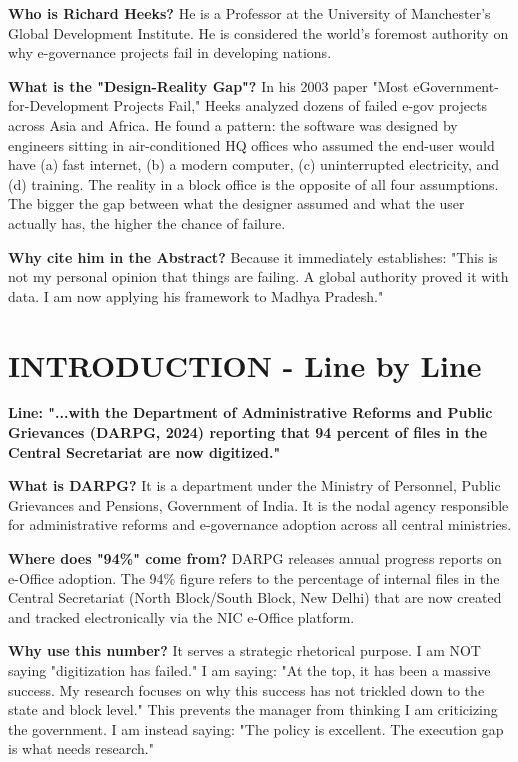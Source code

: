 \documentclass[11pt,a4paper]{article}
\begin{document}
\begin{abox}
\textbf{Who is Richard Heeks?} He is a Professor at the University of Manchester's Global Development Institute. He is considered the world's foremost authority on why e-governance projects fail in developing nations.

\textbf{What is the "Design-Reality Gap"?} In his 2003 paper "Most eGovernment-for-Development Projects Fail," Heeks analyzed dozens of failed e-gov projects across Asia and Africa. He found a pattern: the software was designed by engineers sitting in air-conditioned HQ offices who assumed the end-user would have (a) fast internet, (b) a modern computer, (c) uninterrupted electricity, and (d) training. The reality in a block office is the opposite of all four assumptions. The bigger the gap between what the designer assumed and what the user actually has, the higher the chance of failure.

\textbf{Why cite him in the Abstract?} Because it immediately establishes: "This is not my personal opinion that things are failing. A global authority proved it with data. I am now applying his framework to Madhya Pradesh."
\end{abox}

\section{INTRODUCTION - Line by Line}

\textbf{Line: "...with the Department of Administrative Reforms and Public Grievances (DARPG, 2024) reporting that 94 percent of files in the Central Secretariat are now digitized."}

\begin{abox}
\textbf{What is DARPG?} It is a department under the Ministry of Personnel, Public Grievances and Pensions, Government of India. It is the nodal agency responsible for administrative reforms and e-governance adoption across all central ministries.

\textbf{Where does "94\%" come from?} DARPG releases annual progress reports on e-Office adoption. The 94\% figure refers to the percentage of internal files in the Central Secretariat (North Block/South Block, New Delhi) that are now created and tracked electronically via the NIC e-Office platform.

\textbf{Why use this number?} It serves a strategic rhetorical purpose. I am NOT saying "digitization has failed." I am saying: "At the top, it has been a massive success. My research focuses on why this success has not trickled down to the state and block level." This prevents the manager from thinking I am criticizing the government. I am instead saying: "The policy is excellent. The execution gap is what needs research."
\end{abox}
\end{document}
